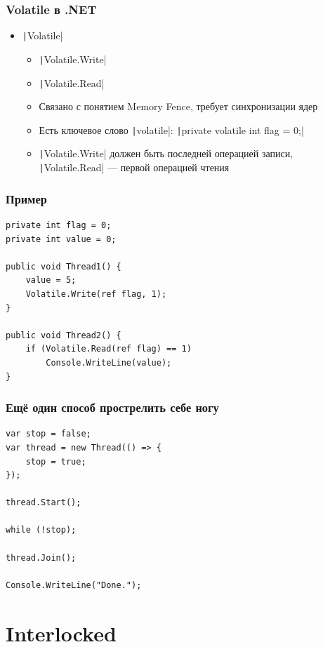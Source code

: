 \documentclass{../../slides-style}
\begin{document}
    \begin{frame}
        \frametitle{Volatile в .NET}
        \begin{itemize}
            \item \texttt|Volatile|
            \begin{itemize}
                \item \texttt|Volatile.Write|
                \item \texttt|Volatile.Read|
                \item Связано с понятием Memory Fence, требует синхронизации ядер
                \item Есть ключевое слово \texttt|volatile|: \texttt|private volatile int flag = 0;|
                \item \texttt|Volatile.Write| должен быть последней операцией записи, \texttt|Volatile.Read| --- первой операцией чтения
            \end{itemize}
        \end{itemize}
    \end{frame}

    \begin{frame}[fragile]
        \frametitle{Пример}
        \begin{verbatim}
private int flag = 0;
private int value = 0;

public void Thread1() {
    value = 5;
    Volatile.Write(ref flag, 1);
}

public void Thread2() {
    if (Volatile.Read(ref flag) == 1)
        Console.WriteLine(value);
}
        \end{verbatim}
    \end{frame}

    \begin{frame}[fragile]
        \frametitle{Ещё один способ прострелить себе ногу}
        \begin{verbatim}
var stop = false;
var thread = new Thread(() => {
    stop = true;
});

thread.Start();

while (!stop);

thread.Join();

Console.WriteLine("Done.");
        \end{verbatim}
    \end{frame}

    \section{Interlocked}
\end{document}
